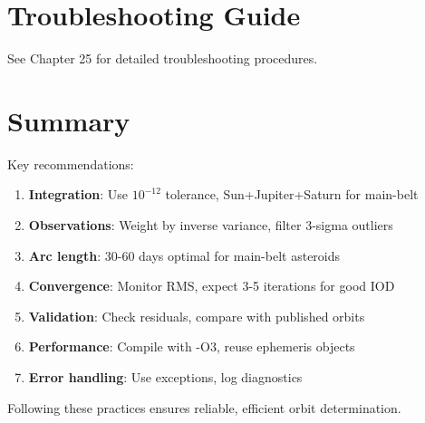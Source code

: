 \section{Troubleshooting Guide}

See Chapter 25 for detailed troubleshooting procedures.

\section{Summary}

Key recommendations:

\begin{enumerate}
    \item \textbf{Integration}: Use $10^{-12}$ tolerance, Sun+Jupiter+Saturn for main-belt
    \item \textbf{Observations}: Weight by inverse variance, filter 3-sigma outliers
    \item \textbf{Arc length}: 30-60 days optimal for main-belt asteroids
    \item \textbf{Convergence}: Monitor RMS, expect 3-5 iterations for good IOD
    \item \textbf{Validation}: Check residuals, compare with published orbits
    \item \textbf{Performance}: Compile with -O3, reuse ephemeris objects
    \item \textbf{Error handling}: Use exceptions, log diagnostics
\end{enumerate}

Following these practices ensures reliable, efficient orbit determination.

